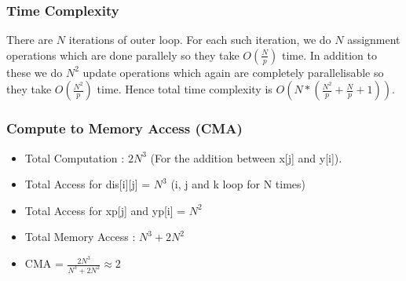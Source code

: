 \documentclass{article}
\begin{document}
\subsubsection{Time Complexity}
There are $N$ iterations of outer loop. For each such iteration, we do $N$ assignment operations which are done parallely so they take $O(\frac{N}{p})$ time. In addition to these we do $N^2$ update operations which again are completely parallelisable so they take $O(\frac{N^2}{p})$ time. Hence total time complexity is $O(N*(\frac{N^2}{p} + \frac{N}{p}+1))$.

\subsubsection{Compute to Memory Access (CMA)}
\begin{itemize}
    \item Total Computation : $2N^3$ (For the addition between x[j] and y[i]).
    \item Total Access for dis[i][j] = $N^3$ (i, j and k loop for N times)
    \item Total Access for xp[j] and yp[i] = $N^2$
    \item Total Memory Access : $N^3 + 2N^2$
    \item CMA = $\frac{2N^3}{N^3 + 2N^2} \approx 2$
\end{itemize}
\end{document}

